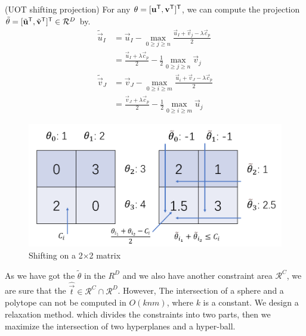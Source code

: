 \begin{thm}
(UOT shifting projection) For any $\theta = [{\mathbf{u}}^{\mathsf T},{\mathbf{v}}^{\mathsf T}]^{\mathsf T}$, we can compute the projection $\tilde{\theta} = [\tilde{\mathbf{u}}^{\mathsf T},\tilde{\mathbf{v}}^{\mathsf T}]^{\mathsf T} \in \mathcal{R}^{D}$ by.
\begin{equation}
\begin{split}
\tilde{\vec{u}}_I &= {\vec{u}}_I - \max_{0\geq j\geq n} \frac{{\vec{u}}_I +{\vec{v}}_j - \lambda\vec{c}_{p}}{2}\\
& = \frac{{\vec{u}}_I +\lambda\vec{c}_{p}}{2} - \frac{1}{2}\max_{0\geq j\geq n} {\vec{v}}_j\\
\tilde{\vec{v}}_J &= {\vec{v}}_J - \max_{0 \geq i \geq m} \frac{{\vec{u}}_i +{\vec{v}}_J - \lambda\vec{c}_{p}}{2}\\
& = \frac{{\vec{v}}_J +\lambda\vec{c}_{p}}{2} - \frac{1}{2}\max_{0\geq i\geq m} {\vec{u}}_j
 \end{split}
 \label{eq:uotproj}
\end{equation}
\end{thm}
	\begin{figure}[h]
	\begin{center}	
	\includegraphics[width = \linewidth]{pic/shifting}
	\caption{Shifting on a 2$\times$2 matrix}
	\end{center}	
	\end{figure}


As we have got the $\tilde{\theta}$ in the $R^{D}$ and we also have another constraint area $\mathcal{R}^{C}$, we are sure that the $\hat{\vec{t}} \in \mathcal{R}^{C}\cap\mathcal{R}^{D}$. However, The intersection of a sphere and a polytope can not be computed in $O(knm)$, where $k$ is a constant. We design a relaxation method. which divides the constraints into two parts, then we maximize the intersection of two hyperplanes and a hyper-ball. 

